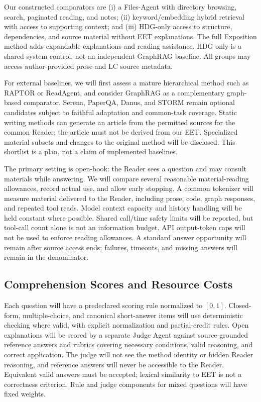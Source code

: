 \documentclass{article}
\begin{document}
Our constructed comparators are (i) a Files-Agent with directory browsing, search, paginated reading, and notes; (ii) keyword/embedding hybrid retrieval with access to supporting context; and (iii) HDG-only access to structure, dependencies, and source material without EET explanations. The full Exposition method adds expandable explanations and reading assistance. HDG-only is a shared-system control, not an independent GraphRAG baseline. All groups may access author-provided prose and LC source metadata.

For external baselines, we will first assess a mature hierarchical method such as RAPTOR or ReadAgent, and consider GraphRAG as a complementary graph-based comparator. Serena, PaperQA, Danus, and STORM remain optional candidates subject to faithful adaptation and common-task coverage. Static writing methods can generate an article from the permitted sources for the common Reader; the article must not be derived from our EET. Specialized material subsets and changes to the original method will be disclosed. This shortlist is a plan, not a claim of implemented baselines.

The primary setting is open-book: the Reader sees a question and may consult materials while answering. We will compare several reasonable material-reading allowances, record actual use, and allow early stopping. A common tokenizer will measure material delivered to the Reader, including prose, code, graph responses, and repeated tool reads. Model context capacity and history handling will be held constant where possible. Shared call/time safety limits will be reported, but tool-call count alone is not an information budget. API output-token caps will not be used to enforce reading allowances. A standard answer opportunity will remain after source access ends; failures, timeouts, and missing answers will remain in the denominator.

\subsection{Comprehension Scores and Resource Costs}
Each question will have a predeclared scoring rule normalized to $[0,1]$. Closed-form, multiple-choice, and canonical short-answer items will use deterministic checking where valid, with explicit normalization and partial-credit rules. Open explanations will be scored by a separate Judge Agent against source-grounded reference answers and rubrics covering necessary conditions, valid reasoning, and correct application. The judge will not see the method identity or hidden Reader reasoning, and reference answers will never be accessible to the Reader. Equivalent valid answers must be accepted; lexical similarity to EET is not a correctness criterion. Rule and judge components for mixed questions will have fixed weights.
\end{document}
